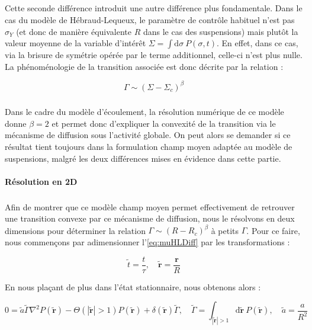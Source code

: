 \subparagraph{}Cette seconde différence introduit une autre différence plus fondamentale. Dans le cas du modèle de Hébraud-Lequeux, le paramètre de contrôle habituel n'est pas $\sigma_Y$ (et donc de manière équivalente $R$ dans le cas des suspensions) mais plutôt la valeur moyenne de la variable d'intérêt $\Sigma = \int \mathrm{d}\sigma~P(\sigma,t)$. En effet, dans ce cas, via la brisure de symétrie opérée par le terme additionnel, celle-ci n'est plus nulle. La phénoménologie de la transition associée est donc décrite par la relation :

\begin{equation}
	\Gamma \sim (\Sigma - \Sigma_c)^\beta
	\label{eq:paramordre_HL}
\end{equation}

\subparagraph{}Dans le cadre du modèle d'écoulement, la résolution numérique de ce modèle donne $\beta=2$ et permet donc d'expliquer la convexité de la transition via le mécanisme de diffusion sous l'activité globale. On peut alors se demander si ce résultat tient toujours dans la formulation champ moyen adaptée au modèle de suspensions, malgré les deux différences mises en évidence dans cette partie.

\paragraph{Résolution en 2D}

\subparagraph{}Afin de montrer que ce modèle champ moyen permet effectivement de retrouver une transition convexe par ce mécanisme de diffusion, nous le résolvons en deux dimensions pour déterminer la relation $\Gamma \sim (R - R_c)^\beta$ à petits $\Gamma$. Pour ce faire, nous commençons par adimensionner l'\autoref{eq:muHLDiff} par les transformations :

\begin{equation}
	\tilde{t} = \frac{t}{\tau}, \quad \tilde{\mathbf{r}} = \frac{\mathbf{r}}{R}
\end{equation}

\noindent En nous plaçant de plus dans l'état stationnaire, nous obtenons alors :

\begin{equation}
    0 = \tilde{a}\tilde{\Gamma}\nabla^2 P(\tilde{\mathbf{r}}) - \Theta(|\tilde{\mathbf{r}}|>1)P(\tilde{\mathbf{r}}) + \delta(\tilde{\mathbf{r}})\tilde{\Gamma}, \quad \tilde{\Gamma} = \int_{|\tilde{\mathbf{r}}|>1}\mathrm{d}\tilde{\mathbf{r}}~P(\tilde{\mathbf{r}}),\quad \tilde{a} = \frac{a}{R^2}
\end{equation} 

